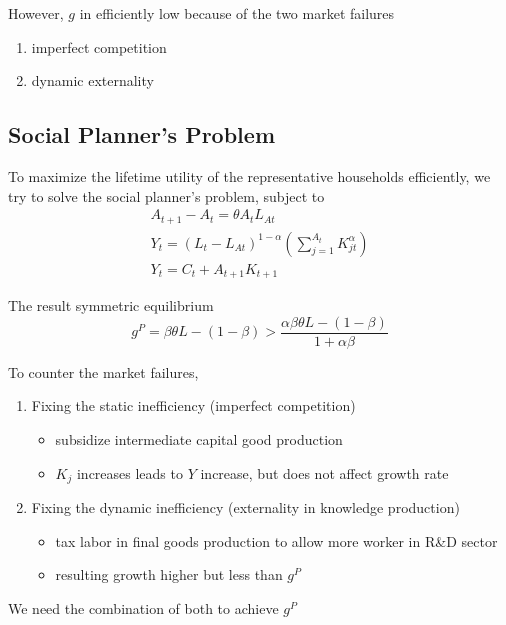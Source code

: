 \documentclass[twocolumn, fleqn]{article}
\begin{document}
		However, $g$ in efficiently low because of the two market failures
		\begin{enumerate}
			\item imperfect competition
			\item dynamic externality
		\end{enumerate}

		\subsection{Social Planner's Problem}
		To maximize the lifetime utility of the representative households efficiently, we try to solve the social
		planner's problem, subject to
		\begin{gather*}
			A_{t+1}- A_t = \theta A_t L_{At}\\
			Y_t = (L_t - L_{At})^{1-\alpha}(\sum_{j=1}^{A_t}K_{jt}^{\alpha})\\
			Y_t = C_t + A_{t+1} K_{t+1}
		\end{gather*}

		The result symmetric equilibrium
		\[g^P = \beta \theta L -(1-\beta) > \frac{\alpha \beta \theta L - (1-\beta)}{1+\alpha \beta}\]

		To counter the market failures,
		\begin{enumerate}
			\item Fixing the static inefficiency (imperfect competition)
			\begin{itemize}
				\item subsidize intermediate capital good production
				\item $K_j$ increases leads to $Y$ increase, but does not affect growth rate
			\end{itemize}
			\item Fixing the dynamic inefficiency (externality in knowledge production)
			\begin{itemize}
				\item tax labor in final goods production to allow more worker in R\&D sector
				\item resulting growth higher but less than $g^P$
			\end{itemize}
		\end{enumerate}
		We need the combination of both to achieve $g^P$
\end{document}

